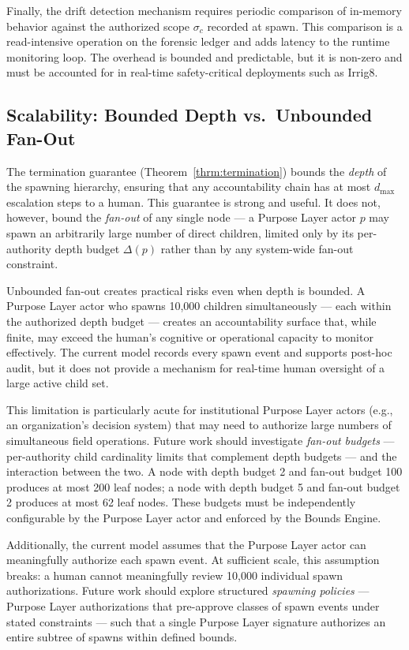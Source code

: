 Finally, the drift detection mechanism requires periodic comparison of in-memory behavior against the authorized scope $\sigma_c$ recorded at spawn. This comparison is a read-intensive operation on the forensic ledger and adds latency to the runtime monitoring loop. The overhead is bounded and predictable, but it is non-zero and must be accounted for in real-time safety-critical deployments such as Irrig8.

\subsection{Scalability: Bounded Depth vs.\ Unbounded Fan-Out}
\label{sec:limitations-scalability}

The termination guarantee (Theorem~\ref{thrm:termination}) bounds the \textit{depth} of the spawning hierarchy, ensuring that any accountability chain has at most $d_{\max}$ escalation steps to a human. This guarantee is strong and useful. It does not, however, bound the \textit{fan-out} of any single node — a Purpose Layer actor $p$ may spawn an arbitrarily large number of direct children, limited only by its per-authority depth budget $\Delta(p)$ rather than by any system-wide fan-out constraint.

Unbounded fan-out creates practical risks even when depth is bounded. A Purpose Layer actor who spawns 10,000 children simultaneously — each within the authorized depth budget — creates an accountability surface that, while finite, may exceed the human's cognitive or operational capacity to monitor effectively. The current model records every spawn event and supports post-hoc audit, but it does not provide a mechanism for real-time human oversight of a large active child set.

This limitation is particularly acute for institutional Purpose Layer actors (e.g., an organization's decision system) that may need to authorize large numbers of simultaneous field operations. Future work should investigate \textit{fan-out budgets} — per-authority child cardinality limits that complement depth budgets — and the interaction between the two. A node with depth budget 2 and fan-out budget 100 produces at most 200 leaf nodes; a node with depth budget 5 and fan-out budget 2 produces at most 62 leaf nodes. These budgets must be independently configurable by the Purpose Layer actor and enforced by the Bounds Engine.

Additionally, the current model assumes that the Purpose Layer actor can meaningfully authorize each spawn event. At sufficient scale, this assumption breaks: a human cannot meaningfully review 10,000 individual spawn authorizations. Future work should explore structured \textit{spawning policies} — Purpose Layer authorizations that pre-approve classes of spawn events under stated constraints — such that a single Purpose Layer signature authorizes an entire subtree of spawns within defined bounds.

